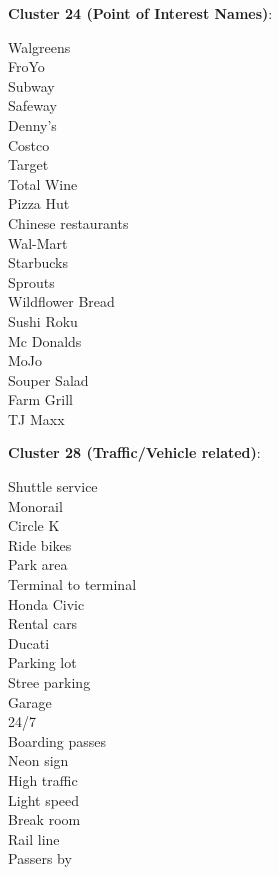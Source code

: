 \documentclass[11pt]{article}
\begin{document}
\textbf{Cluster 24 (Point of Interest Names)}:
\begin{multicols}{3}
Walgreens\\
FroYo\\
Subway\\
Safeway\\
Denny's\\
Costco\\
Target\\
Total Wine\\
Pizza Hut\\
Chinese restaurants\\
Wal-Mart\\
Starbucks\\
Sprouts\\
Wildflower Bread\\
Sushi Roku\\
Mc Donalds\\
MoJo\\
Souper Salad\\
Farm Grill\\
TJ Maxx
\end{multicols}

\textbf{Cluster 28 (Traffic/Vehicle related)}:
\begin{multicols}{3}
Shuttle service\\
Monorail\\
Circle K\\
Ride bikes\\
Park area\\
Terminal to terminal\\
Honda Civic\\
Rental cars\\
Ducati\\
Parking lot\\
Stree parking\\
Garage\\
24/7\\
Boarding passes\\
Neon sign\\
High traffic\\
Light speed\\
Break room\\
Rail line\\
Passers by
\end{multicols}

\pagebreak
\end{document}
